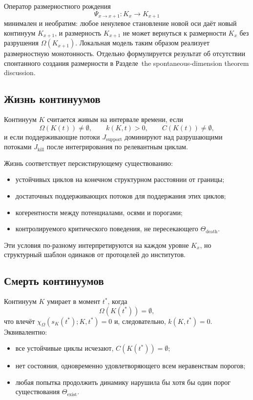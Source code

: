 Оператор размерностного рождения
\[
    \Psi_{x\to x+1}: K_x \to K_{x+1}
\]
минимален и необратим: любое ненулевое становление новой оси даёт новый континуум \(K_{x+1}\),
и размерность \(K_{x+1}\) не может вернуться к размерности \(K_x\) без разрушения
\(\Omega(K_{x+1})\).
Локальная модель таким образом реализует размерностную монотонность. Отдельно формулируется
результат об отсутствии спонтанного создания размерности в
Разделе~the spontaneous-dimension theorem discussion.

\subsection{Жизнь континуумов}

Континуум \(K\) считается живым на интервале времени, если
\[
    \Omega(K(t)) \neq \emptyset,\qquad
    k(K,t) > 0,\qquad
    C(K(t)) \neq \emptyset,
\]
и если поддерживающие потоки \(J_{\mathrm{support}}\) доминируют над
разрушающими потоками \(J_{\mathrm{kill}}\) после интегрирования по релевантным циклам.

Жизнь соответствует персистирующему существованию:
\begin{itemize}
    \item устойчивых циклов на конечном структурном расстоянии от границы;
    \item достаточных поддерживающих потоков для поддержания этих циклов;
    \item когерентности между потенциалами, осями и порогами;
    \item контролируемого критического поведения, не пересекающего \(\Theta_{\mathrm{death}}\).
\end{itemize}

Эти условия по-разному интерпретируются на каждом уровне \(K_x\), но структурный
шаблон одинаков от протоцелей до институтов.

\subsection{Смерть континуумов}

Континуум \(K\) умирает в момент \(t^\ast\), когда
\[
    \Omega(K(t^\ast)) = \emptyset,
\]
что влечёт \(\chi_{\Omega}(s_K(t^\ast);K,t^\ast)=0\) и, следовательно, \(k(K,t^\ast)=0\).
Эквивалентно:
\begin{itemize}
    \item все устойчивые циклы исчезают, \(C(K(t^\ast)) = \emptyset\);
    \item нет состояния, одновременно удовлетворяющего всем неравенствам порогов;
    \item любая попытка продолжить динамику нарушила бы хотя бы один порог существования \(\Theta_{\mathrm{exist}}\).
\end{itemize}


